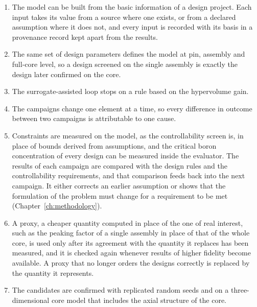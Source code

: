 \begin{enumerate}
  \item The model can be built from the basic information of a design
        project. Each input takes its value from a source where one
        exists, or from a declared assumption where it does not, and
        every input is recorded with its basis in a provenance record
        kept apart from the results.

  \item The same set of design parameters defines the model at pin,
        assembly and full-core level, so a design screened on the single
        assembly is exactly the design later confirmed on the core.

  \item The surrogate-assisted loop stops on a rule based on the
        hypervolume gain.

  \item The campaigns change one element at a time, so every difference
        in outcome between two campaigns is attributable to one cause.

  \item Constraints are measured on the model, as the controllability
        screen is, in place of bounds derived from assumptions, and the
        critical boron concentration of every design can be measured
        inside the evaluator. The results of each campaign are compared
        with the design rules and the controllability requirements, and
        that comparison feeds back into the next campaign. It either
        corrects an earlier assumption or shows that the formulation of
        the problem must change for a requirement to be met
        (Chapter~\ref{ch:methodology}).

  \item A proxy, a cheaper quantity computed in place of the one of real
        interest, such as the peaking factor of a single assembly in
        place of that of the whole core, is used only after its
        agreement with the quantity it replaces has been measured, and it is checked again
        whenever results of higher fidelity become available. A proxy
        that no longer orders the designs correctly is replaced by the quantity it represents.

  \item The candidates are confirmed with replicated random seeds and on
        a three-dimensional core model that includes the axial structure
        of the core.
\end{enumerate}

